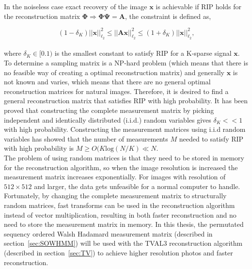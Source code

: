 In the noiseless case exact recovery of the image $\mathbf{x}$ is achievable if RIP holds for the reconstruction matrix $\mathbf{\Phi} \Rightarrow \mathbf{\Phi\Psi = A}$, the constraint is defined as,

\begin{equation}
    (1-\delta_K)||\mathbf{x}||_{\ell_2}^2\leq||\mathbf{Ax}||_{\ell_2}^2\leq(1+\delta_K)||\mathbf{x}||_{\ell_2}^2 \text{,}
\end{equation}\\[0.1in]

where $\delta_K \in [0.1)$ is the smallest constant to satisfy RIP for a K-sparse signal $\mathbf{x}$. To determine a sampling matrix is a NP-hard problem (which means that there is no feasible way of creating a optimal reconstruction matrix) and generally $\textbf{x}$ is not known and varies, which means that there are no general optimal reconstruction matrices for natural images. Therefore, it is desired to find a general reconstruction matrix that satisfies RIP with high probability. It has been proved that constructing the complete measurement matrix by picking independent and identically distributed (i.i.d.) random variables gives $\delta_K << 1$ with high probability. Constructing the measurement matrices using i.i.d random variables has showed that the number of measurements $M$ needed to satisfy RIP with high probability is $M \geq O(K\text{log}(N/K) \ll N$. \cite{book:srr}\\[0.1in]

The problem of using random matrices is that they need to be stored in memory for the reconstruction algorithm, so when the image resolution is increased the measurement matrix increases exponentially. For images with resolution of $512\times 512$ and larger, the data gets unfeasible for a normal computer to handle.\\[0.1in]  

Fortunately, by changing the complete measurement matrix to structurally random matrices, fast transforms can be used in the reconstruction algorithm instead of vector multiplication, resulting in both faster reconstruction and no need to store the measurement matrix in memory. In this thesis, the permutated sequency ordered Walsh Hadamard measurement matrix (described in section~\ref{sec:SOWHMM}) will be used with the TVAL3 reconstruction algorithm (described in section~\ref{sec:TV}) to achieve higher resolution photos and faster reconstruction.   



